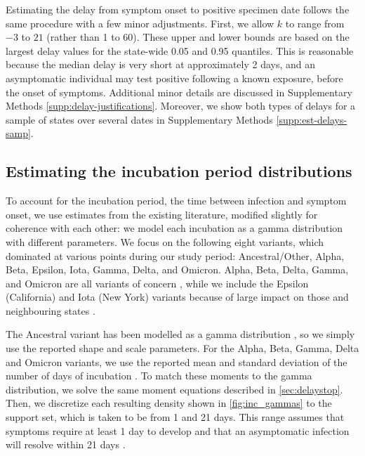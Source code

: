 Estimating the delay from symptom onset to positive specimen date follows the
same procedure with a few minor adjustments. First, we allow $k$ to range from
$-3$ to $21$ (rather than 1 to 60). These upper and lower bounds are based on
the largest delay values for the state-wide 0.05 and 0.95 quantiles. This is
reasonable because the median delay is very short at approximately 2 days, and
an asymptomatic individual may test positive following a known exposure, before
the onset of symptoms. Additional minor details are discussed in
Supplementary Methods \autoref{supp:delay-justifications}. Moreover, we show
both types of delays for a sample of states over several dates
in Supplementary Methods \autoref{supp:est-delays-samp}.

\subsection{Estimating the incubation period distributions} 
\label{sec:incubation}

To account for the incubation period, the time between infection and symptom
onset, we use estimates from the existing literature, modified slightly for
coherence with each other: we model each incubation as a gamma distribution with
different parameters. We focus on the following eight variants, which dominated
at various points during our study period: Ancestral/Other, Alpha, Beta, Epsilon,
Iota, Gamma, Delta, and Omicron. Alpha, Beta, Delta, Gamma, and Omicron are all
variants of concern \citep{who2021tracking}, while we include the Epsilon
(California) and Iota (New York) variants because of large impact on those and
neighbouring states \citep{yang2022investigation, duerr2021dominance}.

The Ancestral variant has been modelled as a gamma distribution
\citep{tindale2020evidence}, so we simply use the reported shape and scale parameters. For the
Alpha, Beta, Gamma, Delta and Omicron variants, we use the reported mean and
standard deviation of the number of days of incubation \citep{tanaka2022shorter,
grant2022impact, ogata2022shorter}. To match these moments to the gamma
distribution, we solve the same moment equations described in
\autoref{sec:delaystop}. Then, we discretize each resulting density shown in \autoref{fig:inc_gammas} to the
support set, which is taken to be from 1 and 21 days. This range assumes that
symptoms require at least 1 day to develop \citealp{phcan2021covid} and that an
asymptomatic infection will resolve within 21 days
\citep{zaki2021estimations,cortes2022sars}.

